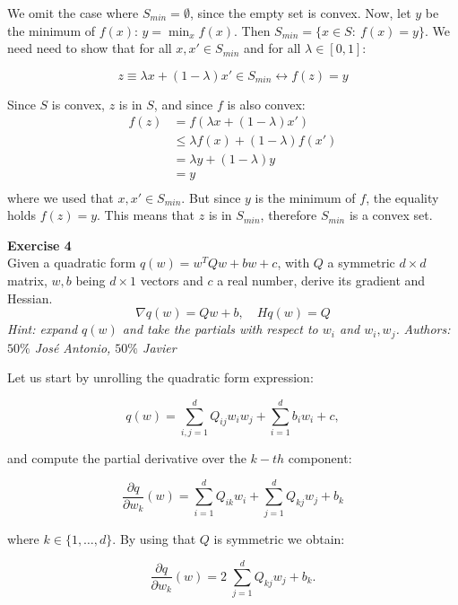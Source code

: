 \documentclass[11pt,table]{article}
\newenvironment{problem}[2][Exercise]
{ \begin{mdframed}[backgroundcolor=gray!20] \textbf{#1 #2} \\}
	{\hspace{0.0cm}\newline\newline \emph{Authors: \(50\%\) José Antonio, \(50\%\) Javier}  \end{mdframed}}
\begin{document}
	We omit the case where \(S_{min} = \emptyset\), since the empty set is convex. Now, let \(y\) be the minimum of \(f(x)\): \(y = \min_x f(x)\). Then \( S_{min} = \{x \in S : \ f(x) = y \} \). We need need to show that for all \(x, x' \in S_{min}\) and for all \(\lambda \in [0,1]\):
	
	\[
	z \equiv \lambda x + (1-\lambda) x' \in S_{min} \leftrightarrow f(z) = y
	\]
	
	Since \(S\) is convex, \(z\) is in \(S\), and since \(f\) is also convex:
	\begin{align*}
		f(z) & = f\left(\lambda x + (1-\lambda) x'\right) \\
		& \leq \lambda f(x) + (1-\lambda) f(x')      \\
		& = \lambda y + (1-\lambda) y                \\
		& = y                                        \\
	\end{align*}
	where we used that \(x, x'\in S_{min}\). But since \(y\) is the minimum of \(f\), the equality holds \(f(z) = y\). This means that \(z\) is in \(S_{min}\), therefore \(S_{min}\) is a convex set.
	
	\begin{problem}{4}
		Given a quadratic form \( q(w) = w^TQw + bw + c \), with \( Q \) a symmetric \( d\times d \) matrix, \( w,b\) being \(d\times 1 \) vectors and \( c \) a real number, derive its gradient and Hessian.
		\[
		\nabla q(w) = Qw + b, \quad Hq(w) = Q
		\]
		\emph{Hint: expand \(q(w)\) and take the partials with respect to \(w_i\) and \(w_i,w_j\).}
	\end{problem}
	
	Let us start by unrolling the quadratic form expression:
	
	\[
	q(w) = \sum_{i,j=1}^{d} Q_{ij} w_{i}w_{j} + \sum_{i=1}^{d}b_{i}w_{i} + c,
	\]
	
	and compute the partial derivative over the \(k-th\) component:
	
	\[
	\frac{\partial q}{\partial w_k} (w) = \sum_{i=1}^{d} Q_{ik} w_{i} + \sum_{j=1}^{d} Q_{kj} w_{j} + b_{k}
	\]
	
	where \(k \in \{1, \ldots, d\}\). By using that \(Q\) is symmetric we obtain:
	
	\begin{equation}
		\label{eq-4}
		\frac{\partial q}{\partial w_k} (w) = 2 \; \sum_{j=1}^{d} Q_{kj} w_{j} + b_{k}.
	\end{equation}
	
\end{document}
